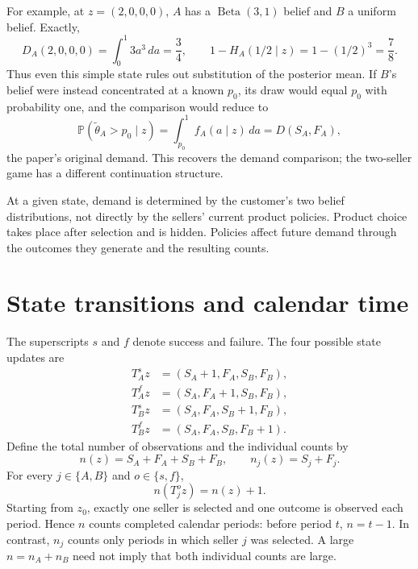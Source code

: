\documentclass[11pt]{article}
\newcommand{\Pb}{\mathbb P}
\begin{document}
For example, at $z=(2,0,0,0)$, $A$ has a $\operatorname{Beta}(3,1)$
belief and $B$ a uniform belief. Exactly,
\begin{equation*}
D_A(2,0,0,0)=\int_0^1 3a^3\,da=\frac34,
\qquad
1-H_A(1/2\mid z)=1-(1/2)^3=\frac78.
\end{equation*}
Thus even this simple state rules out substitution of the posterior mean.
If $B$'s belief were instead concentrated at a known $p_0$, its draw would
equal $p_0$ with probability one, and the comparison would reduce to
\begin{equation}\label{eq:outside-demand}
\Pb(\widetilde\theta_A>p_0\mid z)
=\int_{p_0}^1 f_A(a\mid z)\,da=D(S_A,F_A),
\end{equation}
the paper's original demand. This recovers the demand comparison; the
two-seller game has a different continuation structure.

At a given state, demand is determined by the customer's two belief
distributions, not directly by the sellers' current product policies.
Product choice takes place after selection and is hidden. Policies affect
future demand through the outcomes they generate and the resulting counts.

\section{State transitions and calendar time}

The superscripts $s$ and $f$ denote success and failure. The four possible
state updates are
\begin{equation}\label{eq:transitions}
\begin{aligned}
T_A^s z&=(S_A+1,F_A,S_B,F_B),\\
T_A^f z&=(S_A,F_A+1,S_B,F_B),\\
T_B^s z&=(S_A,F_A,S_B+1,F_B),\\
T_B^f z&=(S_A,F_A,S_B,F_B+1).
\end{aligned}
\end{equation}
Define the total number of observations and the individual counts by
\begin{equation}\label{eq:layers}
n(z)=S_A+F_A+S_B+F_B,\qquad n_j(z)=S_j+F_j.
\end{equation}
For every $j\in\{A,B\}$ and $o\in\{s,f\}$,
\begin{equation}\label{eq:layer-increment}
n(T_j^o z)=n(z)+1.
\end{equation}
Starting from $z_0$, exactly one seller is selected and one outcome is
observed each period. Hence $n$ counts completed calendar periods: before
period $t$, $n=t-1$. In contrast, $n_j$ counts only periods in which
seller $j$ was selected. A large $n=n_A+n_B$ need not imply that both
individual counts are large.
\end{document}
